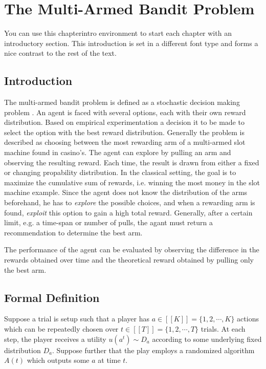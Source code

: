 \documentclass{kecsmstr}
\begin{document}
\chapter{The Multi-Armed Bandit Problem}
\begin{chapterintro}
You can use this chapterintro environment to start each chapter
with an introductory section. This introduction is set in a
different font type and forms a nice contrast to the rest of the
text.
\end{chapterintro}
\begin{chaptercontents}
\section{Introduction}
The multi-armed bandit problem is defined as a stochastic decision making problem . An agent is faced with several options, each with their own reward distribution. Based on empirical experimentation a decision it to be made to select the option with the best reward distribution. Generally the problem is described as choosing between the most rewarding arm of a multi-armed slot machine found in casino's. The agent can explore by pulling an arm and observing the resulting reward. Each time, the result is drawn from either a fixed or changing propability distribution. In the classical setting, the goal is to maximize the cumulative sum of rewards, i.e. winning the most money in the slot machine example. Since the agent does not know the distribution of the arms beforehand, he has to \emph{explore} the possible choices, and when a rewarding arm is found, \emph{exploit} this option to gain a high total reward. Generally, after a certain limit, e.g. a time-span or number of pulls, the agant must return a recommendation to determine the best arm.

The performance of the agent can be evaluated by observing the difference in the rewards obtained over time and the theoretical reward obtained by pulling only the best arm.

\section{Formal Definition}
Suppose a trial is setup such that a player has $a \in [[K]] = \{ 1, 2, \cdots , K \}$ actions which can be repeatedly chosen over $t \in [[T]] = \{ 1, 2, \cdots, T \}$ trials. At each step, the player receives a utility $u(a^t) \sim D_a$ according to some underlying fixed distribution $D_a$. Suppose further that the play employs a randomized algorithm $A(t)$ which outputs some $a$ at time $t$. 


\end{chaptercontents}
\end{document}
